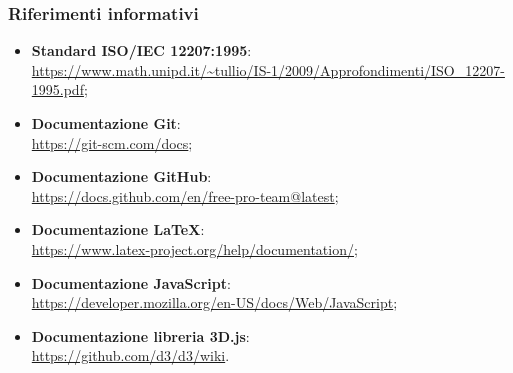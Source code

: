 \documentclass[../norme_di_progetto.tex]{subfiles}
\begin{document}
\subsubsection{Riferimenti informativi}
\begin{itemize}
    \item \textbf{Standard ISO/IEC 12207:1995}: \\
    \url{https://www.math.unipd.it/~tullio/IS-1/2009/Approfondimenti/ISO_12207-1995.pdf};
    \item \textbf{Documentazione Git}: \\
    \url{https://git-scm.com/docs};
    \item \textbf{Documentazione GitHub}: \\
    \url{https://docs.github.com/en/free-pro-team@latest};
    \item \textbf{Documentazione LaTeX}: \\
    \url{https://www.latex-project.org/help/documentation/};
    \item \textbf{Documentazione JavaScript}: \\
    \url{https://developer.mozilla.org/en-US/docs/Web/JavaScript};
    \item \textbf{Documentazione libreria 3D.js}: \\
    \url{https://github.com/d3/d3/wiki}.

\end{itemize}
\end{document}
